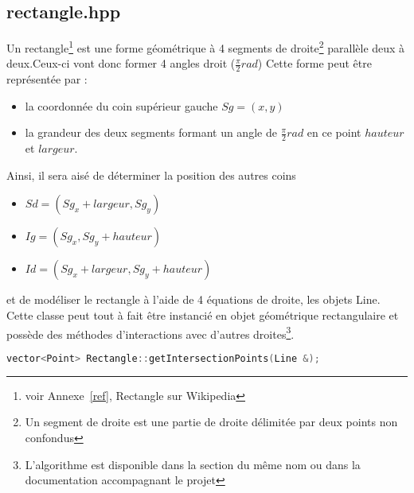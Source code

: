 \documentclass[a4paper,11pt]{report}
\begin{document}
\subsection[Rectangle]{rectangle.hpp}
\begin{center}
\end{center}
Un rectangle\footnote{voir Annexe~\ref{ref}, Rectangle sur Wikipedia}  est une forme géométrique à 4 segments de droite\footnote{Un
	segment de droite est une partie de droite délimitée par deux points non
confondus} 
parallèle deux à deux.Ceux-ci vont donc former 4 angles droit ($\frac{\pi}{2} rad$)
Cette forme peut être représentée par :
\begin{itemize}
	\item la coordonnée du coin supérieur gauche $Sg = (x, y)$
	\item la grandeur des deux segments formant un angle de $\frac{\pi}{2} rad$
		en ce point $hauteur$ et $largeur$.
\end{itemize}

Ainsi, il sera aisé de déterminer la position des autres coins 
\begin{itemize}
	\item $Sd = (Sg_x + largeur, Sg_y)$
	\item $Ig = (Sg_x , Sg_y + hauteur)$
	\item $Id = (Sg_x + largeur, Sg_y + hauteur)$
\end{itemize}
et de modéliser le rectangle à l'aide de 4 équations de droite, les objets Line.
Cette classe peut tout à fait être instancié en objet géométrique rectangulaire
et possède des méthodes d'interactions avec d'autres droites\footnote{L'algorithme
	est disponible dans la section du même nom ou dans la documentation
accompagnant le projet}.
\begin{lstlisting}[frame=single,language=C++]
vector<Point> Rectangle::getIntersectionPoints(Line &);
\end{lstlisting}
\end{document}
